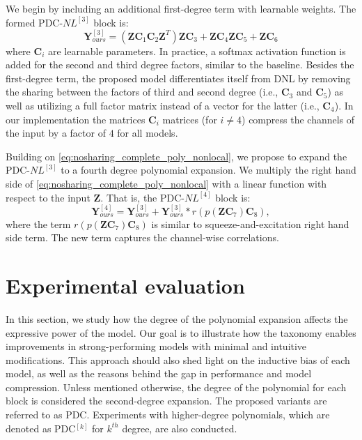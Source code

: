 \documentclass[runningheads]{llncs}
\newcommand{\noshare}{PDC}
\providecommand{\minvar}{\bm{Z}}
\begin{document}
We begin by including an additional first-degree term with learnable weights. The formed \noshare-$NL^{[3]}$ block is:
\begin{equation}
    {\bm{Y}}^{[3]}_{ours} = (\minvar \bm{C}_1 \bm{C}_2 \minvar^T)\minvar\bm{C}_3 + \minvar \bm{C}_4\minvar\bm{C}_5 + \minvar\bm{C}_6
    \label{eq:nosharing_complete_poly_nonlocal}
\end{equation}
where $\bm{C}_i$ are learnable parameters. In practice, a softmax activation function is added for the second and third degree factors, similar to the baseline. Besides the first-degree term, the proposed model differentiates itself from DNL by removing the sharing between the factors of third and second degree (i.e., $\bm{C}_3$ and $\bm{C}_5$) as well as utilizing a full factor matrix instead of a vector for the latter (i.e., $\bm{C}_4$).
In our implementation the matrices $\bm{C}_i$ matrices (for $i\neq4$) compress the channels of the input by a factor of $4$ for all models. 

Building on \eqref{eq:nosharing_complete_poly_nonlocal}, we propose to expand the \noshare-$NL^{[3]}$ to a fourth degree polynomial expansion. We multiply the right hand side of \eqref{eq:nosharing_complete_poly_nonlocal} with a linear function with respect to the input $\minvar$. That is, the \noshare-$NL^{[4]}$ block is:
\begin{equation}
    {\bm{Y}}^{[4]}_{ours} = {\bm{Y}}^{[3]}_{ours} + {\bm{Y}}^{[3]}_{ours} * r(p(\minvar\bm{C}_7)\bm{C}_8),
    \label{eq:nosharing_fourth_degree_nonlocal}
\end{equation}
where the term $r(p(\minvar\bm{C}_7)\bm{C}_8)$ is similar to squeeze-and-excitation right hand side term. The new term captures the channel-wise correlations. 











 \section{Experimental evaluation}
\label{sec:nosharing_experiments}

In this section, we study how the degree of the polynomial expansion affects the expressive power of the model.
Our goal is to illustrate how the taxonomy enables improvements in strong-performing models with minimal and intuitive modifications. This approach should also shed light on the inductive bias of each model, as well as the reasons behind the gap in performance and model compression.
Unless mentioned otherwise, the degree of the polynomial for each block is considered the second-degree expansion. The proposed variants are referred to as \noshare. 
Experiments with higher-degree polynomials, which are denoted as \noshare$^{[k]}$ for $k^{th}$ degree, are also conducted.
\end{document}
